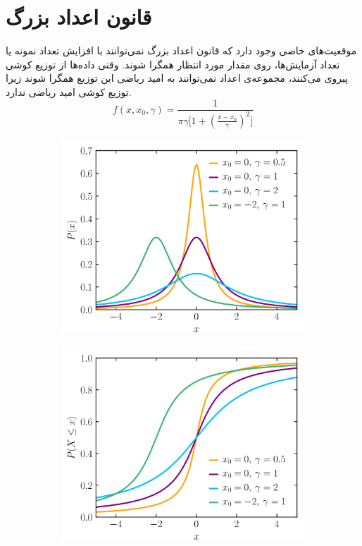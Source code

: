 \documentclass[a4paper]{article}
\begin{document}
\section{قانون اعداد بزرگ}
موقعیت‌های خاصی وجود دارد که قانون اعداد بزرگ نمی‌توانند با افزایش تعداد نمونه یا تعداد آزمایش‌ها، روی مقدار مورد انتظار همگرا شوند. وقتی داده‌ها از توزیع کوشی پیروی می‌کنند، مجموعه‌ی اعداد نمی‌توانند به امید ریاضی این توزیع همگرا شوند زیرا توزیع کوشی امید ریاضی ندارد.
\begin{equation*}
	f(x,x_{0},\gamma) = \frac{1}{\pi \gamma \big[ 1 + (\frac{x-x_{0}}{\gamma})^{2} \big]}
\end{equation*}
\begin{figure}[H]
	\centering
	\begin{subfigure}{.5\textwidth}
		\centering
		\includegraphics[width=.9\linewidth]{Cauchy}
		\caption{
		}
	\end{subfigure}%
	\begin{subfigure}{.5\textwidth}
		\centering
		\includegraphics[width=.9\linewidth]{Cauchy2}
		\caption{
		}
	\end{subfigure}
	\caption{}
\end{figure}
\end{document}
